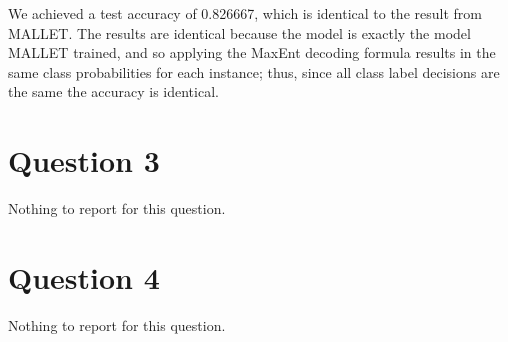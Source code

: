 \documentclass[oneside,justified,marginals=raggedouter]{tufte-handout}
\begin{document}
We achieved a test accuracy of 0.826667, which is identical to the result from MALLET. The results
are identical because the model is exactly the model MALLET trained, and so applying the MaxEnt
decoding formula results in the same class probabilities for each instance; thus, since all class
label decisions are the same the accuracy is identical.

\section{Question 3}

Nothing to report for this question.

\section{Question 4}

Nothing to report for this question.
\end{document}
